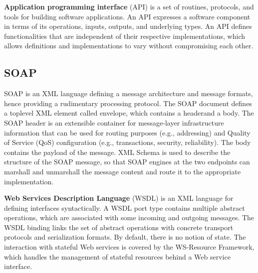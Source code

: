 \documentclass[thesis=B,english]{FITthesis}[2012/10/20]
\begin{document}
\textbf{Application programming interface} (API) is a set of routines, protocols, and tools for building software applications. An API expresses a software component in terms of its operations, inputs, outputs, and underlying types. An API defines functionalities that are independent of their respective implementations, which allows definitions and implementations to vary without compromising each other.

\subsection{SOAP}
SOAP is an XML language defining a message architecture and message formats, hence providing a rudimentary processing protocol. The SOAP document defines a toplevel XML element called envelope, which contains a headerand a body. The SOAP header is an extensible container for message-layer infrastructure information that can be used for routing purposes (e.g., addressing) and Quality of Service (QoS) configuration (e.g., transactions, security, reliability). The body contains the payload of the message. XML Schema is used to describe the structure of the SOAP message, so that SOAP engines at the two endpoints can marshall and unmarshall the message content and route it to the appropriate implementation.

\textbf{Web Services Description Language} (WSDL) is an XML language for defining interfaces syntactically. A WSDL port type contains multiple abstract operations, which are associated with some incoming and outgoing messages. The WSDL binding links the set of abstract operations with concrete transport protocols and serialization formats. By default, there is no notion of state. The interaction with stateful Web services is covered by the WS-Resource Framework, which handles the management of stateful resources behind a Web service interface.
\end{document}
